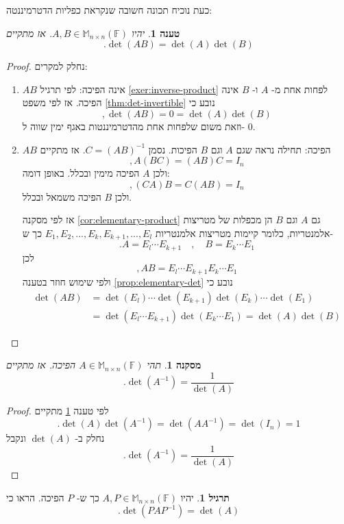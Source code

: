 \documentclass[12pt]{report}
\theoremstyle{plain}
\newtheorem{proposition}[theorem]{טענה}
\newtheorem{corollary}[theorem]{מסקנה}
\theoremstyle{definition}
\newtheorem{exercise}{תרגיל}[chapter]
\newcommand{\F}{\mathbb{F}}
\newcommand{\M}{\mathbb{M}}
\newcommand{\0}{\mathbf{0}}
\begin{document}
כעת נוכיח תכונה חשובה שנקראת כפליות הדטרמיננטה:
\begin{proposition}\label{prop:det-product}
יהיו 
$A,B\in\M_{n\times n}(\F)$.
אז מתקיים
$$
.\det(AB)=\det(A)\det(B)
$$
\end{proposition}

\begin{proof}
נחלק למקרים:
\begin{enumerate}[label=\alph*.]
\item
$AB$
אינה הפיכה:
לפי תרגיל
\ref{exer:inverse-product}
לפחות אחת מ-
$A$
ו-
$B$
אינה הפיכה. אז לפי משפט
\ref{thm:det-invertible}
נובע כי
$$
,\det(AB)=0=\det(A)\det(B)
$$
וזאת משום שלפחות אחת מהדטרמיננטות באגף ימין שווה ל-
$0$.

\item 
$AB$
הפיכה:
תחילה נראה שגם
$A$
וגם
$B$
הפיכות. נסמן
$C=(AB)^{-1}$.
אז מתקיים
$$
,A(BC)=(AB)C=I_n
$$
ולכן
$A$
הפיכה מימין ובכלל. באופן דומה:
$$
,(CA)B=C(AB)=I_n
$$
ולכן
$B$
הפיכה משמאל ובכלל.

אז לפי מסקנה
\ref{cor:elementary-product}
גם 
$A$
וגם
$B$
הן מכפלות של מטריצות אלמנטריות, כלומר
קיימות מטריצות אלמנטריות
$E_1,E_2,...,E_k,E_{k+1},...,E_l$
כך ש-
$$
.A=E_l\cdots E_{k+1}\quad,\quad B=E_k\cdots E_1
$$
לכן
$$
,AB=E_l\cdots E_{k+1}E_k\cdots E_1
$$
ולפי שימוש חוזר בטענה
\ref{prop:elementary-det}
נובע כי
$$
\begin{aligned}
\det(AB)&=\det(E_l)\cdots \det(E_{k+1})\det(E_k)\cdots \det(E_1)\\
&=\det(E_l\cdots E_{k+1})\det(E_k\cdots E_1)=\det(A)\det(B)
\end{aligned}
$$


\end{enumerate}
\end{proof}

\begin{corollary}\label{cor:det-inverse}
תהי
$A\in\M_{n\times n}(\F)$
הפיכה. אז מתקיים
$$
.\det(A^{-1})=\frac{1}{\det(A)}
$$
\end{corollary}

\begin{proof}
לפי טענה
\ref{prop:det-product}
מתקיים
$$
.\det(A)\det(A^{-1})=\det(AA^{-1})=\det(I_n)=1
$$
נחלק ב-
$\det(A)$
ונקבל
$$
.\det(A^{-1})=\frac{1}{\det(A)}
$$
\end{proof}

\begin{exercise}\label{exer:similar-det}
יהיו
$A,P\in\M_{n\times n}(\F)$
כך ש-
$P$
הפיכה. הראו כי
$$
.\det(PAP^{-1})=\det(A)
$$
\end{exercise}
\end{document}
